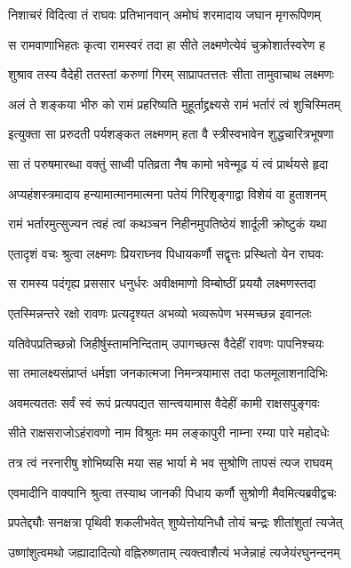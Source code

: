\twolineshloka
{निशाचरं विदित्वा तं राघवः प्रतिभानवान्}
{अमोघं शरमादाय जघान मृगरूपिणम्}


\twolineshloka
{स रामवाणाभिहतः कृत्वा रामस्वरं तदा}
{हा सीते लक्ष्मणेत्येवं चुक्रोशार्तस्वरेण ह}


\twolineshloka
{शुश्राव तस्य वैदेही ततस्तां करुणां गिरम्}
{साप्रापतत्ततः सीता तामुवाचाथ लक्ष्मणः}


\twolineshloka
{अलं ते शङ्कया भीरु को रामं प्रहरिष्यति}
{मुहूर्ताद्द्रक्ष्यसे रामं भर्तारं त्वं शुचिस्मितम्}


\twolineshloka
{इत्युक्ता सा प्ररुदती पर्यशङ्कत लक्ष्मणम्}
{हता वै स्त्रीस्वभावेन शुद्धचारित्रभूषणा}


\twolineshloka
{सा तं परुषमारब्धा वक्तुं साध्वी पतिव्रता}
{नैष कामो भवेन्मूढ यं त्वं प्रार्थयसे हृदा}


\twolineshloka
{अप्यहंशस्त्रमादाय हन्यामात्मानमात्मना}
{पतेयं गिरिशृङ्गाद्वा विशेयं वा हुताशनम्}


\twolineshloka
{रामं भर्तारमुत्सुज्यन त्वहं त्वां कथञ्चन}
{निहीनमुपतिष्ठेयं शार्दूली क्रोष्टुकं यथा}


\twolineshloka
{एतादृशं वचः श्रुत्वा लक्ष्मणः प्रियराघ्नव}
{पिधायकर्णौ सद्वृत्तः प्रस्थितो येन राघवः}


\twolineshloka
{स रामस्य पदंगृह्य प्रससार धनुर्धरः}
{अवीक्षमाणो विम्बोष्ठीं प्रययौ लक्ष्मणस्तदा}


\twolineshloka
{एतस्मिन्नन्तरे रक्षो रावणः प्रत्यदृश्यत}
{अभव्यो भव्यरूपेण भस्मच्छन्न इवानलः}


\twolineshloka
{यतिवेपप्रतिच्छन्नो जिहीर्षुस्तामनिन्दिताम्}
{उपागच्छत्स वैदेहीं रावणः पापनिश्चयः}


\twolineshloka
{सा तमालक्ष्यसंप्राप्तं धर्मज्ञा जनकात्मजा}
{निमन्त्रयामास तदा फलमूलाशनादिभिः}


\twolineshloka
{अवमत्यततः सर्वं स्वं रूपं प्रत्यपद्यत}
{सान्त्वयामास वैदेहीं कामी राक्षसपुङ्गवः}


\twolineshloka
{सीते राक्षसराजोऽहंरावणो नाम विश्रुतः}
{मम लङ्कापुरी नाम्ना रम्या पारे महोदधेः}


\twolineshloka
{तत्र त्वं नरनारीषु शोभिष्यसि मया सह}
{भार्या मे भव सुश्रोणि तापसं त्यज राघवम्}


\twolineshloka
{एवमादीनि वाक्यानि श्रुत्वा तस्याथ जानकी}
{पिधाय कर्णौ सुश्रोणी मैवमित्यब्रवीद्वचः}


\twolineshloka
{प्रपतेद्द्यौः सनक्षत्रा पृथिवी शकलीभवेत्}
{शुष्येत्तोयनिधौ तोयं चन्द्रः शीतांशुतां त्यजेत्}


\twolineshloka
{उष्णांशुत्वमथो जह्यादादित्यो वह्निरुष्णताम्}
{त्यक्त्वाशैत्यं भजेन्नाहं त्यजेयंरघुनन्दनम्}


